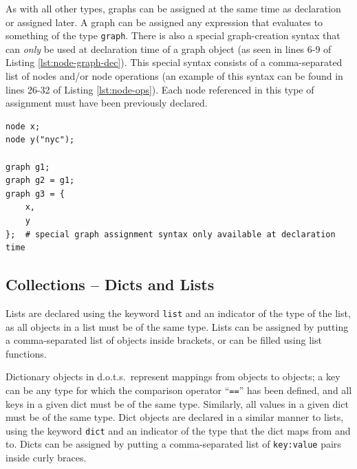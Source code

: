\documentclass{article}
\newcommand{\pltlang}{d.o.t.s.} %
\newcommand{\code}[1]{\texttt{#1}} %
\begin{document}
As with all other types, graphs can be assigned at the same time as declaration or assigned later. A graph can be assigned any expression that evaluates to something of the type \code{graph}. There is also a special graph-creation syntax that can \emph{only} be used at declaration time of a graph object  (as seen in lines 6-9 of Listing \ref{lst:node-graph-dec}). This special syntax consists of a comma-separated list of nodes and/or node operations (an example of this syntax can be found in lines 26-32 of Listing \ref{lst:node-ops}). Each node referenced in this type of assignment must have been previously declared. \\

\begin{lstlisting}[language=pltLang, caption=Declaration of ``node'' and ``graph'' objects., label=lst:node-graph-dec]
node x;
node y("nyc");

graph g1;
graph g2 = g1;
graph g3 = { 
    x,
    y
};  # special graph assignment syntax only available at declaration time

\end{lstlisting}

\subsection{Collections -- Dicts and Lists}

Lists are declared using the keyword \code{list} and an indicator of the type of the list, as all objects in a list must be of the same type. Lists can be assigned by putting a comma-separated list of objects inside brackets, or can be filled using list functions.

Dictionary objects in \pltlang\ represent mappings from objects to objects; a key can be any type for which the comparison operator ``\code{==}'' has been defined, and all keys in a given dict must be of the same type. Similarly, all values in a given dict must be of the same type. Dict objects are declared in a similar manner to lists, using the keyword \code{dict} and an indicator of the type that the dict maps from and to. Dicts can be assigned by putting a comma-separated list of \code{key:value} pairs inside curly braces.
\end{document}
